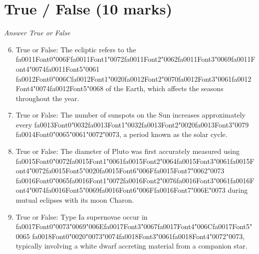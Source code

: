 \documentclass[12pt]{article}
\begin{document}
\section*{True / False (10 marks)}
\textit{Answer True or False}
\begin{enumerate}[label=\arabic*.]
\setcounter{enumi}{5}
\item True or False: The ecliptic refers to the {\csname fa0011Font0\endcsname\char"006F}{\csname fa0011Font1\endcsname\char"0072}{\csname fa0011Font2\endcsname\char"0062}{\csname fa0011Font3\endcsname\char"0069}{\csname fa0011Font4\endcsname\char"0074}{\csname fa0011Font5\endcsname\char"0061} {\csname fa0012Font0\endcsname\char"006C}{\csname fa0012Font1\endcsname\char"0020}{\csname fa0012Font2\endcsname\char"0070}{\csname fa0012Font3\endcsname\char"0061}{\csname fa0012Font4\endcsname\char"0074}{\csname fa0012Font5\endcsname\char"0068} of the Earth, which affects the seasons throughout the year.
\item True or False: The number of sunspots on the Sun increases approximately every {\csname fa0013Font0\endcsname\char"0032}{\csname fa0013Font1\endcsname\char"0032}{\csname fa0013Font2\endcsname\char"0020}{\csname fa0013Font3\endcsname\char"0079} {\csname fa0014Font0\endcsname\char"0065}{\char"0061}{\char"0072}{\char"0073}, a period known as the solar cycle.
\item True or False: The diameter of Pluto was first accurately measured using {\csname fa0015Font0\endcsname\char"0072}{\csname fa0015Font1\endcsname\char"0061}{\csname fa0015Font2\endcsname\char"0064}{\csname fa0015Font3\endcsname\char"0061}{\csname fa0015Font4\endcsname\char"0072}{\csname fa0015Font5\endcsname\char"0020}{\csname fa0015Font6\endcsname\char"006F}{\csname fa0015Font7\endcsname\char"0062}{\char"0073} {\csname fa0016Font0\endcsname\char"0065}{\csname fa0016Font1\endcsname\char"0072}{\csname fa0016Font2\endcsname\char"0076}{\csname fa0016Font3\endcsname\char"0061}{\csname fa0016Font4\endcsname\char"0074}{\csname fa0016Font5\endcsname\char"0069}{\csname fa0016Font6\endcsname\char"006F}{\csname fa0016Font7\endcsname\char"006E}{\char"0073} during mutual eclipses with its moon Charon.
\item True or False: Type Ia supernovae occur in {\csname fa0017Font0\endcsname\char"0073}{\char"0069}{\char"006E}{\csname fa0017Font3\endcsname\char"0067}{\csname fa0017Font4\endcsname\char"006C}{\csname fa0017Font5\endcsname\char"0065} {\csname fa0018Font0\endcsname\char"0020}{\char"0073}{\char"0074}{\csname fa0018Font3\endcsname\char"0061}{\csname fa0018Font4\endcsname\char"0072}{\char"0073}, typically involving a white dwarf accreting material from a companion star.

\end{enumerate}
\end{document}
